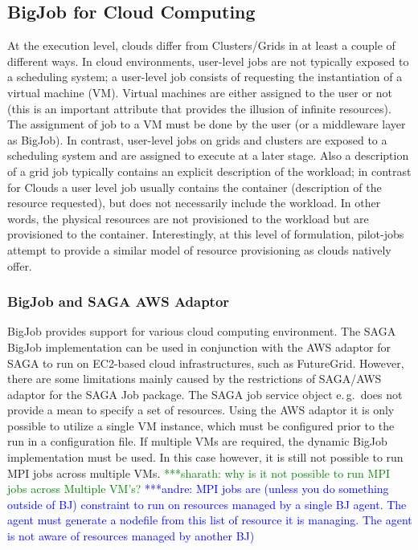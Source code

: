 \documentclass[]{article}
\newcommand{\alnote}[1]{ {\textcolor{blue} { ***andre: #1 }}}
\newcommand{\smnote}[1]{ {\textcolor{green} { ***sharath: #1 }}}
\newcommand{\alnote}[1]{}
\newcommand{\smnote}[1]{}
\begin{document}
\subsection{BigJob for Cloud Computing}

At the execution level, clouds differ from Clusters/Grids in at least a couple
of different ways. In cloud environments, user-level jobs are not typically
exposed to a scheduling system; a user-level job consists of requesting the
instantiation of a virtual machine (VM). Virtual machines are either assigned to
the user or not (this is an important attribute that provides the illusion of
infinite resources). The assignment of job to a VM must be done by the user (or
a middleware layer as BigJob). In contrast, user-level jobs on grids and 
clusters are exposed to a scheduling system and are
assigned to execute at a later stage. Also a description of a grid job typically
contains an explicit description of the workload; in contrast for Clouds a user
level job usually contains the container (description of the resource
requested), but does not necessarily include the workload. In other words, the
physical resources are not provisioned to the workload but are provisioned to
the container.  Interestingly, at this level of formulation, pilot-jobs attempt 
to provide a similar model of resource provisioning as clouds natively offer. 

\subsubsection{BigJob and SAGA AWS Adaptor}

BigJob provides support for various cloud computing environment. The SAGA BigJob
implementation can be used in conjunction with the AWS adaptor for SAGA to run
on EC2-based cloud infrastructures, such as FutureGrid. However, there are some 
limitations mainly caused by the restrictions of SAGA/AWS adaptor for the SAGA 
Job package. The SAGA job service object e.\,g.\ does not provide a mean to 
specify a set of resources. Using the AWS adaptor it is only possible to utilize 
a single VM instance, which must be configured prior to the run in a 
configuration file. If multiple VMs are required, the dynamic BigJob 
implementation must be used. In this case however, it is still not possible to 
run MPI jobs across multiple VMs. 
\smnote {why is it not possible to run MPI jobs across Multiple VM's?} \alnote{MPI jobs are (unless you do something outside of BJ) constraint to run
on resources managed by a single BJ agent. The agent must generate a nodefile
from this list of resource it is managing. The agent is not aware of resources
managed by another BJ)}
\end{document}
